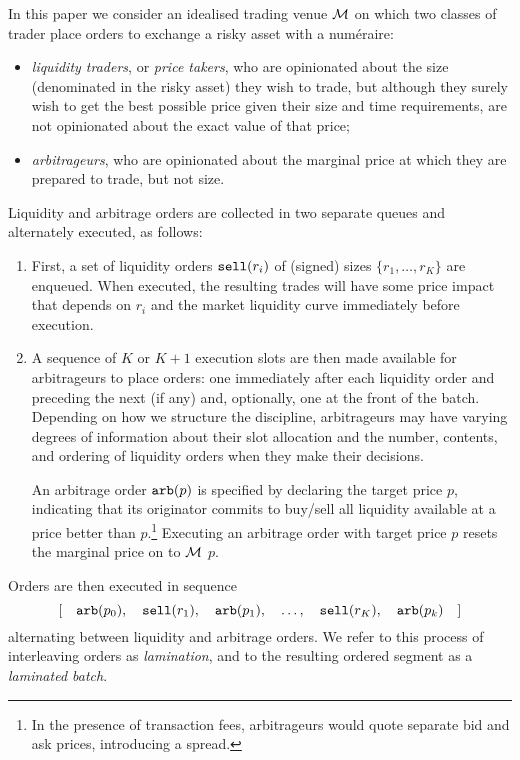In this paper we consider an idealised trading venue $\mathcal{M}$ on which two classes of trader place orders to exchange a risky asset with a num\'eraire:
\begin{itemize}
  \item \emph{liquidity traders}, or \emph{price takers}, who are opinionated about the size (denominated in the risky asset) they wish to trade, but although they surely wish to get the best possible price given their size and time requirements, are not opinionated about the exact value of that price;
  \item \emph{arbitrageurs}, who are opinionated about the marginal price at which they are prepared to trade, but not size.
\end{itemize}
Liquidity and arbitrage orders are collected in two separate queues and alternately executed, as follows:
%
\begin{enumerate}
  \item 
    First, a set of liquidity orders $\mathtt{sell}(r_i)$ of (signed) sizes $\{r_1,\ldots,r_K\}$ are enqueued.
    When executed, the resulting trades will have some price impact that depends on $r_i$ and the market liquidity curve immediately before execution.
  
  \item
    A sequence of $K$ or $K+1$ execution slots are then made available for arbitrageurs to place orders: one immediately after each liquidity order and preceding the next (if any) and, optionally, one at the front of the batch.
    Depending on how we structure the discipline, arbitrageurs may have varying degrees of information about their slot allocation and the number, contents, and ordering of liquidity orders when they make their decisions.

    An arbitrage order $\mathtt{arb}(p)$ is specified by declaring the target price $p$, indicating that its originator commits to buy/sell all liquidity available at a price better than $p$.\footnote{In the presence of transaction fees, arbitrageurs would quote separate bid and ask prices, introducing a spread.}
    Executing an arbitrage order with target price $p$ resets the marginal price on to $\mathcal{M}$ $p$.

\end{enumerate}
Orders are then executed in sequence
\[
 [\quad \mathtt{arb}(p_0),\quad \mathtt{sell}(r_1),\quad \mathtt{arb}(p_1),\quad \ldots,\quad \mathtt{sell}(r_K),\quad \mathtt{arb}(p_k) \quad]
\]
alternating between liquidity and arbitrage orders.
%
We refer to this process of interleaving orders as \emph{lamination}, and to the resulting ordered segment as a \emph{laminated batch}.


